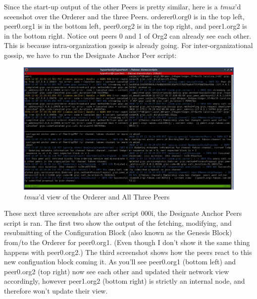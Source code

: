 	\newpage
	\hspace{10mm}Since the start-up output of the other Peers is pretty similar, here is a \textit{tmux}'d sceenshot over the Orderer and the three Peers. orderer0.org0 is in the top left, peer0.org1 is in the bottom left, peer0.org2 is in the top right, and peer1.org2 is in the bottom right. Notice out peers 0 and 1 of Org2 can already see each other. This is because intra-organization gossip is already going. For inter-organizational gossip, we have to run the Designate Anchor Peer script:
	
		\begin{figure}[H]
		\includegraphics[width=\textwidth]{./fabsec-report-network-flow/network-flow-8.jpg}
		\caption{\textit{tmux}'d view of the Orderer and All Three Peers}
		\end{figure}
		
	\newpage
	\hspace{10mm}These next three screenshots are after script 000i, the Designate Anchor Peers script is ran. The first two show the output of the fetching, modifying, and resubmitting of the Configuration Block (also known as the Genesis Block) from/to the Orderer for peer0.org1. (Even though I don't show it the same thing happens with peer0.org2.) The third screenshot shows how the peers react to this new configuation block coming it. As you'll see peer0.org1 (bottom left) and peer0.org2 (top right) now see each other and updated their network view accordingly, however peer1.org2 (bottom right) is strictly an internal node, and therefore won't update their view.
	
